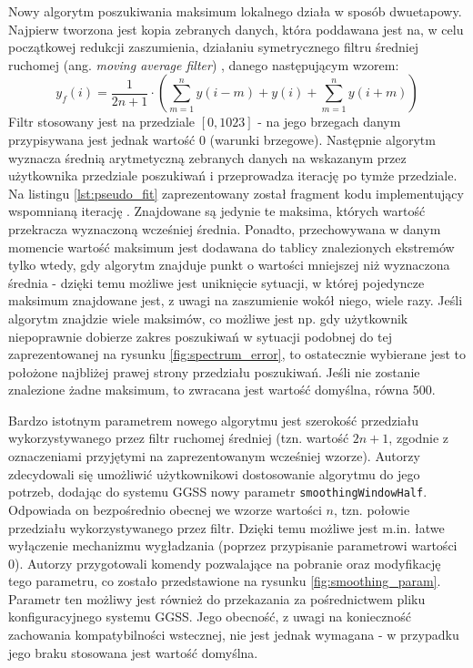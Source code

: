 Nowy algorytm poszukiwania maksimum lokalnego działa w sposób dwuetapowy. Najpierw tworzona jest kopia zebranych danych, która poddawana jest na, w celu początkowej redukcji zaszumienia, działaniu symetrycznego filtru średniej ruchomej (ang. \emph{moving average filter}) \cite{smoothing}, danego następującym wzorem:
\begin{equation}
y_f(i) = \frac{1}{2n + 1} \cdot \left(\sum_{m=1}^{n} y(i - m) + y(i) + \sum_{m=1}^{n} y(i + m) \right)
\end{equation}
Filtr stosowany jest na przedziale $[0, 1023]$ - na jego brzegach danym przypisywana jest jednak wartość 0 (warunki brzegowe). Następnie algorytm wyznacza średnią arytmetyczną zebranych danych na wskazanym przez użytkownika przedziale poszukiwań i przeprowadza iterację po tymże przedziale. Na listingu \ref{lst:pseudo_fit} zaprezentowany został fragment kodu implementujący wspomnianą iterację \cite{baeldung_fit}. Znajdowane są jedynie te maksima, których wartość przekracza wyznaczoną wcześniej średnia. Ponadto, przechowywana w danym momencie wartość maksimum jest dodawana do tablicy znalezionych ekstremów tylko wtedy, gdy algorytm znajduje punkt o wartości mniejszej niż wyznaczona średnia - dzięki temu możliwe jest uniknięcie sytuacji, w której pojedyncze maksimum znajdowane jest, z uwagi na zaszumienie wokół niego, wiele razy. Jeśli algorytm znajdzie wiele maksimów, co możliwe jest np. gdy użytkownik niepoprawnie dobierze zakres poszukiwań w sytuacji podobnej do tej zaprezentowanej na rysunku \ref{fig:spectrum_error}, to ostatecznie wybierane jest to położone najbliżej prawej strony przedziału poszukiwań. Jeśli nie zostanie znalezione żadne maksimum, to zwracana jest wartość domyślna, równa 500. 



Bardzo istotnym parametrem nowego algorytmu jest szerokość przedziału wykorzystywanego przez filtr ruchomej średniej (tzn. wartość $2n + 1$, zgodnie z oznaczeniami przyjętymi na zaprezentowanym wcześniej wzorze). Autorzy zdecydowali się umożliwić użytkownikowi dostosowanie algorytmu do jego potrzeb, dodając do systemu GGSS nowy parametr \lstinline{smoothingWindowHalf}. Odpowiada on bezpośrednio obecnej we wzorze wartości $n$, tzn. połowie przedziału wykorzystywanego przez filtr. Dzięki temu możliwe jest m.in. łatwe wyłączenie mechanizmu wygładzania (poprzez przypisanie parametrowi wartości 0). Autorzy przygotowali komendy pozwalające na pobranie oraz modyfikację tego parametru, co zostało przedstawione na rysunku \ref{fig:smoothing_param}. Parametr ten możliwy jest również do przekazania za pośrednictwem pliku konfiguracyjnego systemu GGSS. Jego obecność, z uwagi na konieczność zachowania kompatybilności wstecznej, nie jest jednak wymagana - w przypadku jego braku stosowana jest wartość domyślna.

